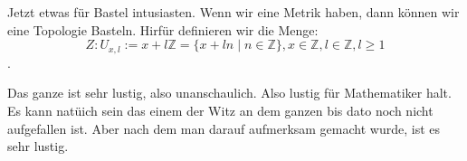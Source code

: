 \chapter{}
Jetzt etwas für Bastel intusiasten.
Wenn wir eine Metrik haben, dann können wir eine Topologie Basteln. 
Hirfür definieren wir die Menge:
$$Z : U_{x,l }:= x + l\mathbb{Z} = \{x + ln \mid n \in \mathbb{Z}\}, x \in \mathbb{Z}, l\in \mathbb{Z}, l \ge 1$$.


Das ganze ist sehr lustig, also unanschaulich. Also lustig für Mathematiker halt. 
Es kann natüich sein das einem der Witz an dem ganzen bis dato noch nicht aufgefallen ist. 
Aber nach dem man darauf aufmerksam gemacht wurde, ist es sehr lustig.
\bigskip

